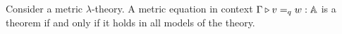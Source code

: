 \begin{theorem}[Completeness] \cite[Theorem 3.16]{dahlqvist2023syntactic} \label{thm:completeness_metric_no_cond}
Consider a  metric $\lambda$-theory. A metric equation in context
$\Gamma \triangleright v =_{q} w : \mathbb{A}$
is a theorem if and only if it holds in all models of the theory.
\end{theorem}

